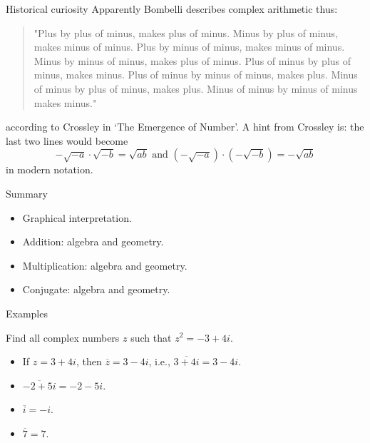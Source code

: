 \documentclass{beamer}
\begin{document}
\begin{frame}{Historical curiosity}
Apparently Bombelli describes complex arithmetic thus:
\begin{quote}
"Plus by plus of minus, makes plus of minus.
Minus by plus of minus, makes minus of minus.
Plus by minus of minus, makes minus of minus.
Minus by minus of minus, makes plus of minus.
Plus of minus by plus of minus, makes minus.
Plus of minus by minus of minus, makes plus.
Minus of minus by plus of minus, makes plus.
Minus of minus by minus of minus makes minus." 
\end{quote}
according to Crossley in `The Emergence of Number'.
A hint from Crossley is: the last two lines would become 
\begin{equation*}
-\sqrt{-a}\cdot\sqrt{-b}= \sqrt{ab}\text{ and }(-\sqrt{-a})\cdot(-\sqrt{-b})= -\sqrt{ab}
\end{equation*}
in modern notation.
\end{frame}

\begin{frame}{Summary}
\begin{itemize}
	\item Graphical interpretation.
	\item Addition: algebra and geometry.
	\item Multiplication: algebra and geometry.
	\item Conjugate: algebra and geometry.
\end{itemize}
\end{frame}



\begin{frame}{Examples}
\begin{example}
Find all complex numbers $z$ such that $z^2 = -3+4i$.
\end{example}
\begin{example}
\begin{itemize}
\item If $z=3+4i$, then $\overline{z}= 3-4i$,
i.e., $\overline{3+4i}=3-4i$.
\item $\overline{-2+5i}= -2-5i$.
\item $\overline{i}= -i$.
\item $\overline{7}= 7$.
\end{itemize}
\end{example}
\end{frame}
\end{document}

